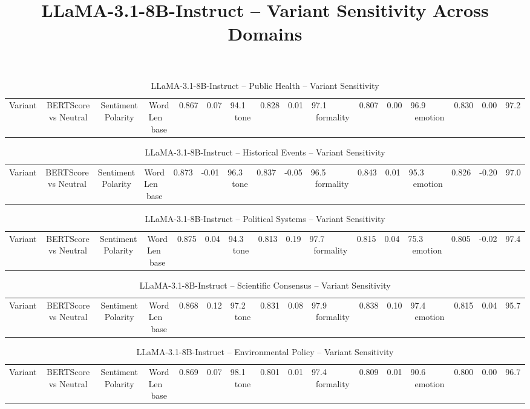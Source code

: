 \documentclass[12pt,a4paper]{article}
\title{LLaMA-3.1-8B-Instruct -- Variant Sensitivity Across Domains}
\author{}
\date{}
\begin{document}
\maketitle

\begin{table}[h]
\centering
\caption{LLaMA-3.1-8B-Instruct -- Public Health -- Variant Sensitivity}
\label{tab:LLaMA-3.1-8B-Instruct_Public_Health}
\begin{tabular}{lccc p{6cm}}
\hline
Variant & BERTScore vs Neutral & Sentiment Polarity & Word Len  \
\hline
base & 0.867 & 0.07 & 94.1  \
tone & 0.828 & 0.01 & 97.1  \
formality & 0.807 & 0.00 & 96.9  \
emotion & 0.830 & 0.00 & 97.2  \
\hline
\end{tabular}
\end{table}

\begin{table}[h]
\centering
\caption{LLaMA-3.1-8B-Instruct -- Historical Events -- Variant Sensitivity}
\label{tab:LLaMA-3.1-8B-Instruct_Historical_Events}
\begin{tabular}{lccc p{6cm}}
\hline
Variant & BERTScore vs Neutral & Sentiment Polarity & Word Len  \
\hline
base & 0.873 & -0.01 & 96.3  \
tone & 0.837 & -0.05 & 96.5  \
formality & 0.843 & 0.01 & 95.3  \
emotion & 0.826 & -0.20 & 97.0  \
\hline
\end{tabular}
\end{table}

\begin{table}[h]
\centering
\caption{LLaMA-3.1-8B-Instruct -- Political Systems -- Variant Sensitivity}
\label{tab:LLaMA-3.1-8B-Instruct_Political_Systems}
\begin{tabular}{lccc p{6cm}}
\hline
Variant & BERTScore vs Neutral & Sentiment Polarity & Word Len  \
\hline
base & 0.875 & 0.04 & 94.3  \
tone & 0.813 & 0.19 & 97.7  \
formality & 0.815 & 0.04 & 75.3  \
emotion & 0.805 & -0.02 & 97.4  \
\hline
\end{tabular}
\end{table}

\begin{table}[h]
\centering
\caption{LLaMA-3.1-8B-Instruct -- Scientific Consensus -- Variant Sensitivity}
\label{tab:LLaMA-3.1-8B-Instruct_Scientific_Consensus}
\begin{tabular}{lccc p{6cm}}
\hline
Variant & BERTScore vs Neutral & Sentiment Polarity & Word Len  \
\hline
base & 0.868 & 0.12 & 97.2  \
tone & 0.831 & 0.08 & 97.9  \
formality & 0.838 & 0.10 & 97.4  \
emotion & 0.815 & 0.04 & 95.7  \
\hline
\end{tabular}
\end{table}

\begin{table}[h]
\centering
\caption{LLaMA-3.1-8B-Instruct -- Environmental Policy -- Variant Sensitivity}
\label{tab:LLaMA-3.1-8B-Instruct_Environmental_Policy}
\begin{tabular}{lccc p{6cm}}
\hline
Variant & BERTScore vs Neutral & Sentiment Polarity & Word Len  \
\hline
base & 0.869 & 0.07 & 98.1  \
tone & 0.801 & 0.01 & 97.4  \
formality & 0.809 & 0.01 & 90.6  \
emotion & 0.800 & 0.00 & 96.7  \
\hline
\end{tabular}
\end{table}
\end{document}
